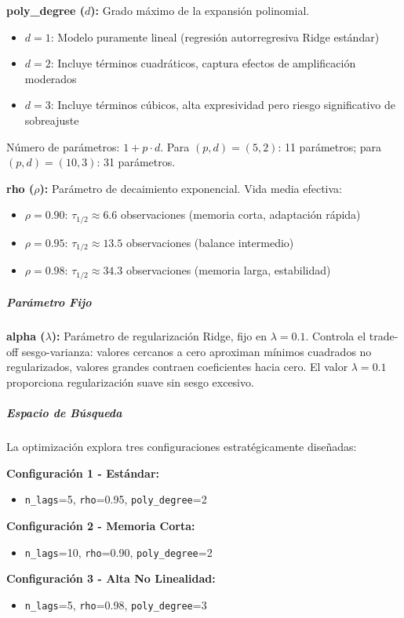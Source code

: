 \textbf{poly\_degree ($d$):} Grado máximo de la expansión polinomial.
\begin{itemize}
\item $d=1$: Modelo puramente lineal (regresión autorregresiva Ridge estándar)
\item $d=2$: Incluye términos cuadráticos, captura efectos de amplificación moderados
\item $d=3$: Incluye términos cúbicos, alta expresividad pero riesgo significativo de sobreajuste
\end{itemize}

Número de parámetros: $1 + p \cdot d$. Para $(p,d)=(5,2)$: 11 parámetros; para $(p,d)=(10,3)$: 31 parámetros.

\textbf{rho ($\rho$):} Parámetro de decaimiento exponencial. Vida media efectiva:
\begin{itemize}
\item $\rho = 0.90$: $\tau_{1/2} \approx 6.6$ observaciones (memoria corta, adaptación rápida)
\item $\rho = 0.95$: $\tau_{1/2} \approx 13.5$ observaciones (balance intermedio)
\item $\rho = 0.98$: $\tau_{1/2} \approx 34.3$ observaciones (memoria larga, estabilidad)
\end{itemize}

\subparagraph{Parámetro Fijo}

\textbf{alpha ($\lambda$):} Parámetro de regularización Ridge, fijo en $\lambda=0.1$. Controla el trade-off sesgo-varianza: valores cercanos a cero aproximan mínimos cuadrados no regularizados, valores grandes contraen coeficientes hacia cero. El valor $\lambda=0.1$ proporciona regularización suave sin sesgo excesivo.

\subparagraph{Espacio de Búsqueda}

La optimización explora tres configuraciones estratégicamente diseñadas:

\textbf{Configuración 1 - Estándar:}
\begin{itemize}
\item \texttt{n\_lags}=5, \texttt{rho}=0.95, \texttt{poly\_degree}=2
\end{itemize}

\textbf{Configuración 2 - Memoria Corta:}
\begin{itemize}
\item \texttt{n\_lags}=10, \texttt{rho}=0.90, \texttt{poly\_degree}=2
\end{itemize}

\textbf{Configuración 3 - Alta No Linealidad:}
\begin{itemize}
\item \texttt{n\_lags}=5, \texttt{rho}=0.98, \texttt{poly\_degree}=3
\end{itemize}

